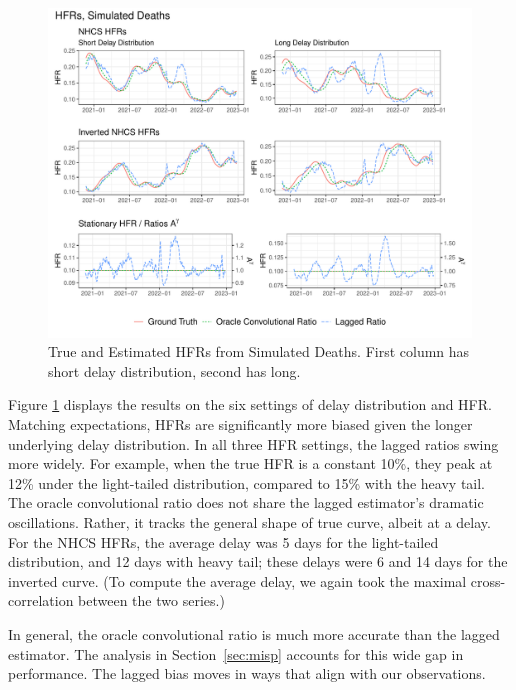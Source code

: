 \documentclass{article}
\renewcommand{\hat}{\widehat} %
\begin{document}
\begin{figure}
    \centering
    \includegraphics[width=\linewidth]{Figures/Simulated/simulated_results_corr_lag.pdf}
    \caption{True and Estimated HFRs from Simulated Deaths. First column has short delay distribution, second has long.}
    \label{fig:sims}
\end{figure}

Figure \ref{fig:sims} displays the results on the six settings of delay distribution and HFR. 
Matching expectations, HFRs are significantly more biased given the longer underlying delay distribution. 
In all three HFR settings, the lagged ratios swing more widely. For example, when the true HFR is a constant 10\%, they peak at 12\% under the light-tailed distribution, compared to 15\% with the heavy tail. The oracle convolutional ratio does not share the lagged estimator's dramatic oscillations. Rather, it tracks the general shape of true curve, albeit at a delay. For the NHCS HFRs, the average delay was 5 days for the light-tailed distribution, and 12 days with heavy tail; these delays were 6 and 14 days for the inverted curve. (To compute the average delay, we again took the maximal cross-correlation between the two series.)

In general, the oracle convolutional ratio is much more accurate than the lagged estimator. The analysis in Section~\ref{sec:misp} accounts for this wide gap in performance. The lagged bias moves in ways that align with our observations.
\end{document}

